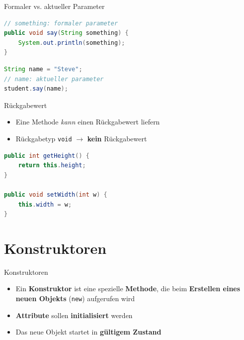 \documentclass[18pt]{beamer}
\begin{document}
\begin{frame}[fragile]{Formaler vs. aktueller Parameter}
    \begin{exampleblock}{}
        \begin{lstlisting}[language=Java]
// something: formaler parameter
public void say(String something) {
    System.out.println(something);
}
        \end{lstlisting}
    \end{exampleblock}
    \begin{exampleblock}{}
        \begin{lstlisting}[language=Java]
String name = "Steve";
// name: aktueller parameter
student.say(name);
        \end{lstlisting}
    \end{exampleblock}
\end{frame}

\begin{frame}[fragile]{Rückgabewert}
    \begin{itemize}
        \item Eine Methode \textit{kann} einen Rückgabewert liefern
        \item Rückgabetyp \texttt{void} $\rightarrow$ \textbf{kein} Rückgabewert
    \end{itemize}
    \begin{exampleblock}{}
        \begin{lstlisting}[language=Java]
public int getHeight() {
    return this.height;
}

public void setWidth(int w) {
    this.width = w;
}
        \end{lstlisting}
    \end{exampleblock}
\end{frame}

\section{Konstruktoren}

\begin{frame}{Konstruktoren}
    \begin{itemize}
        \item Ein \textbf{Konstruktor} ist eine spezielle \textbf{Methode}, die beim \textbf{Erstellen eines neuen Objekts} (\texttt{new}) aufgerufen wird
        \item \textbf{Attribute} sollen \textbf{initialisiert} werden
        \item Das neue Objekt startet in \textbf{gültigem Zustand}
    \end{itemize}
\end{frame}
\end{document}

